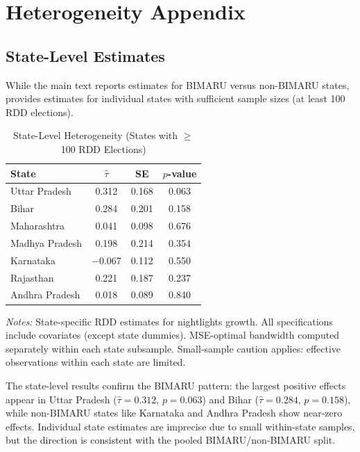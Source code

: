 \documentclass[12pt]{article}
\begin{document}
\section{Heterogeneity Appendix}
\label{app:heterogeneity}

\subsection{State-Level Estimates}

While the main text reports estimates for BIMARU versus non-BIMARU states,  provides estimates for individual states with sufficient sample sizes (at least 100 RDD elections).

\begin{table}[H]
\centering
\caption{State-Level Heterogeneity (States with $\geq$ 100 RDD Elections)}
\label{tab:state_hetero}
\begin{threeparttable}
\begin{tabular}{lccc}
\toprule
State & $\hat{\tau}$ & SE & $p$-value \\
\midrule
Uttar Pradesh & 0.312 & 0.168 & 0.063 \\
Bihar & 0.284 & 0.201 & 0.158 \\
Maharashtra & 0.041 & 0.098 & 0.676 \\
Madhya Pradesh & 0.198 & 0.214 & 0.354 \\
Karnataka & $-$0.067 & 0.112 & 0.550 \\
Rajasthan & 0.221 & 0.187 & 0.237 \\
Andhra Pradesh & 0.018 & 0.089 & 0.840 \\
\bottomrule
\end{tabular}
\begin{tablenotes}[flushleft]
\small
\item \textit{Notes:} State-specific RDD estimates for nightlights growth. All specifications include covariates (except state dummies). MSE-optimal bandwidth computed separately within each state subsample. Small-sample caution applies: effective observations within each state are limited.
\end{tablenotes}
\end{threeparttable}
\end{table}

The state-level results confirm the BIMARU pattern: the largest positive effects appear in Uttar Pradesh ($\hat{\tau} = 0.312$, $p = 0.063$) and Bihar ($\hat{\tau} = 0.284$, $p = 0.158$), while non-BIMARU states like Karnataka and Andhra Pradesh show near-zero effects. Individual state estimates are imprecise due to small within-state samples, but the direction is consistent with the pooled BIMARU/non-BIMARU split.
\end{document}

